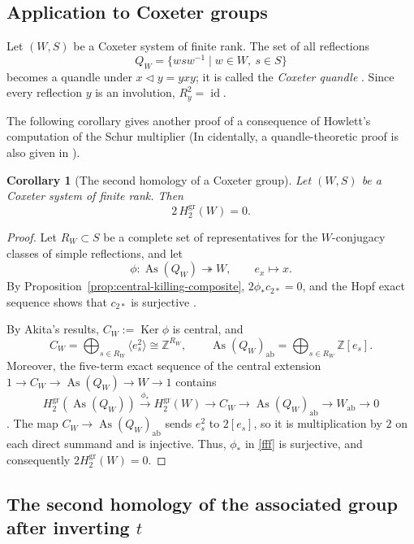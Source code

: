 \documentclass[10pt,a4paper]{amsart}
\newtheorem{corollary}[theorem]{Corollary}
\DeclareMathOperator{\As}{As}
\DeclareMathOperator{\Ker}{Ker}
\newcommand{\ZZ}{\mathbb Z}
\newcommand{\gr}{\mathrm{gr}}
\newcommand{\ab}{\mathrm{ab}}
\begin{document}
\subsection{Application to Coxeter groups}
\label{subsec:coxeter-application}

Let $(W,S)$ be a Coxeter system of finite rank. The set of all reflections
\[
 Q_W=\{wsw^{-1}\mid w\in W,\ s\in S\}
\]
becomes a quandle under $x\lhd y=yxy$; it is called the \emph{Coxeter
quandle} \cite{AkitaCoxeter}. Since every reflection $y$ is an involution,
$R_y^2=\operatorname{id}$.


The following corollary gives another proof of a consequence of Howlett's computation of the Schur multiplier \cite{HowlettCoxeter} (In cidentally, a quandle-theoretic proof is also given in \cite[Corollary 4.4]{Akita2026}).
\begin{corollary}[The second homology of a Coxeter group]
\label{cor:coxeter-H2}
Let $(W,S)$ be a Coxeter system of finite rank. Then
\[
 2\,H_2^{\gr}(W)=0.
\]
\end{corollary}

\begin{proof}
Let $R_W\subset S$ be a complete set of representatives for the
$W$-conjugacy classes of simple reflections, and let
\[
 \phi\colon\As(Q_W)\twoheadrightarrow W,
 \qquad e_x\longmapsto x.
\]
By Proposition~\ref{prop:central-killing-composite},
$2\phi_*c_{2*}=0$, and the Hopf exact sequence shows that $c_{2*}$ is
surjective \cite[Chapter~II, \S5]{Brown}.

By Akita's results, $C_W:=\Ker\phi$ is central, and
\[
 C_W=\bigoplus_{s\in R_W}\langle e_s^2\rangle\cong\ZZ^{R_W},
 \qquad
 \As(Q_W)_{\ab}=\bigoplus_{s\in R_W}\ZZ[e_s].
\]
Moreover, the five-term exact sequence of the central extension
$1\to C_W\to\As(Q_W)\to W\to1$ contains
\begin{equation}\label{fff} 
 H_2^{\gr}(\As(Q_W)) \stackrel{\phi_*}{\longrightarrow} H_2^{\gr}(W)
 \longrightarrow C_W\longrightarrow\As(Q_W)_{\ab}
 \longrightarrow W_{\ab}\longrightarrow0
\end{equation} 
\cite[Proposition~2.4, Lemma~2.5 and Theorem~3.1]{AkitaCoxeter}. The map $C_W\to\As(Q_W)_{\ab}$ sends $e_s^2$ to $2[e_s]$, so it is
multiplication by $2$ on each direct summand and is injective. Thus,
$\phi_*$ in \eqref{fff} 
is surjective, and consequently $2H_2^{\gr}(W)=0$.
\end{proof}

\subsection{The second homology of the associated group after inverting \texorpdfstring{$t$}{t}}
\label{subsec:H2-away-from-type}
\end{document}
